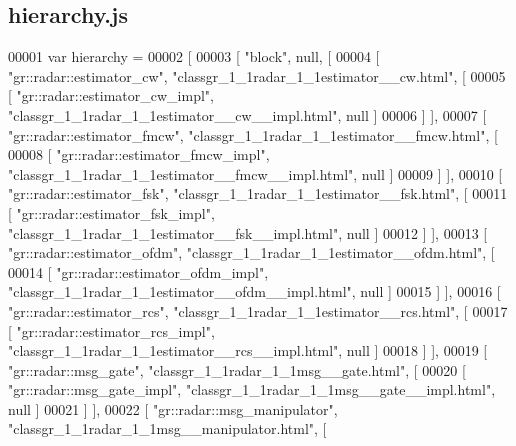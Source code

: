 \subsection{hierarchy.\+js}
\label{hierarchy_8js_source}

\begin{DoxyCode}
00001 var hierarchy =
00002 [
00003     [ \textcolor{stringliteral}{"block"}, null, [
00004       [ \textcolor{stringliteral}{"gr::radar::estimator\_cw"}, \textcolor{stringliteral}{"classgr\_1\_1radar\_1\_1estimator\_\_cw.html"}, [
00005         [ \textcolor{stringliteral}{"gr::radar::estimator\_cw\_impl"}, \textcolor{stringliteral}{"classgr\_1\_1radar\_1\_1estimator\_\_cw\_\_impl.html"}, null ]
00006       ] ],
00007       [ \textcolor{stringliteral}{"gr::radar::estimator\_fmcw"}, \textcolor{stringliteral}{"classgr\_1\_1radar\_1\_1estimator\_\_fmcw.html"}, [
00008         [ \textcolor{stringliteral}{"gr::radar::estimator\_fmcw\_impl"}, \textcolor{stringliteral}{"classgr\_1\_1radar\_1\_1estimator\_\_fmcw\_\_impl.html"}, null ]
00009       ] ],
00010       [ \textcolor{stringliteral}{"gr::radar::estimator\_fsk"}, \textcolor{stringliteral}{"classgr\_1\_1radar\_1\_1estimator\_\_fsk.html"}, [
00011         [ \textcolor{stringliteral}{"gr::radar::estimator\_fsk\_impl"}, \textcolor{stringliteral}{"classgr\_1\_1radar\_1\_1estimator\_\_fsk\_\_impl.html"}, null ]
00012       ] ],
00013       [ \textcolor{stringliteral}{"gr::radar::estimator\_ofdm"}, \textcolor{stringliteral}{"classgr\_1\_1radar\_1\_1estimator\_\_ofdm.html"}, [
00014         [ \textcolor{stringliteral}{"gr::radar::estimator\_ofdm\_impl"}, \textcolor{stringliteral}{"classgr\_1\_1radar\_1\_1estimator\_\_ofdm\_\_impl.html"}, null ]
00015       ] ],
00016       [ \textcolor{stringliteral}{"gr::radar::estimator\_rcs"}, \textcolor{stringliteral}{"classgr\_1\_1radar\_1\_1estimator\_\_rcs.html"}, [
00017         [ \textcolor{stringliteral}{"gr::radar::estimator\_rcs\_impl"}, \textcolor{stringliteral}{"classgr\_1\_1radar\_1\_1estimator\_\_rcs\_\_impl.html"}, null ]
00018       ] ],
00019       [ \textcolor{stringliteral}{"gr::radar::msg\_gate"}, \textcolor{stringliteral}{"classgr\_1\_1radar\_1\_1msg\_\_gate.html"}, [
00020         [ \textcolor{stringliteral}{"gr::radar::msg\_gate\_impl"}, \textcolor{stringliteral}{"classgr\_1\_1radar\_1\_1msg\_\_gate\_\_impl.html"}, null ]
00021       ] ],
00022       [ \textcolor{stringliteral}{"gr::radar::msg\_manipulator"}, \textcolor{stringliteral}{"classgr\_1\_1radar\_1\_1msg\_\_manipulator.html"}, [

\end{DoxyCode}
